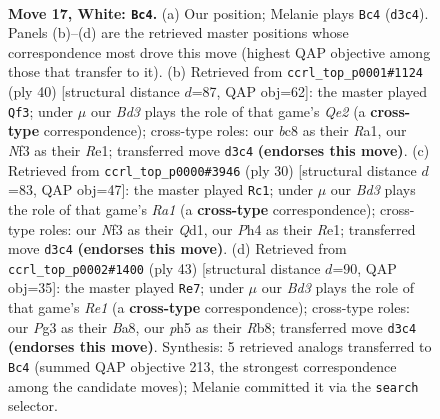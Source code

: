 \documentclass[11pt]{article}
\begin{document}
\clearpage

\begin{figure}[p]\centering
\begin{subfigure}{0.46\textwidth}\centering
\resizebox{\linewidth}{!}{%
\newchessgame
\chessboard[
  setfen={r1bqk2r/5p2/1p2pnp1/p1b4p/P4B1P/1P1B1NP1/2P1QP2/R3R1K1 w q - 1 17},
  showmover=false,
  pgfstyle=straightmove, color=movearrow, markmove={d3-c4}
]}
\caption{}
\end{subfigure}\hfill
\begin{subfigure}{0.46\textwidth}\centering
\resizebox{\linewidth}{!}{%
\newchessgame
\chessboard[
  setfen={4r1k1/1pq1npp1/p2r1b1p/P2p4/2pP1P2/2N1P1P1/1P2Q1BP/R3R2K w - - 3 21},
  showmover=false,
  pgfstyle=straightmove, color=movearrow, markmove={e2-f3}
]}
\caption{}
\end{subfigure}
\\[4pt]
\begin{subfigure}{0.46\textwidth}\centering
\resizebox{\linewidth}{!}{%
\newchessgame
\chessboard[
  setfen={r1b1r1k1/1pqn1pbp/p2p2p1/2pP4/P4B2/1P3NPP/4PPB1/R2QR1K1 w - - 1 16},
  showmover=false,
  pgfstyle=straightmove, color=movearrow, markmove={a1-c1}
]}
\caption{}
\end{subfigure}\hfill
\begin{subfigure}{0.46\textwidth}\centering
\resizebox{\linewidth}{!}{%
\newchessgame
\chessboard[
  setfen={br2r1k1/p4pp1/1p1bqn1p/1Bpp4/3P4/1P2P1P1/PBRNQPP1/2R3K1 b - - 8 22},
  showmover=false,
  pgfstyle=straightmove, color=movearrow, markmove={e8-e7}
]}
\caption{}
\end{subfigure}
\caption{\textbf{Move 17, White: \texttt{Bc4}.} (a) Our position; Melanie plays \texttt{Bc4} (\texttt{d3c4}). Panels (b)--(d) are the retrieved master positions whose correspondence most drove this move (highest QAP objective among those that transfer to it). (b) Retrieved from \texttt{ccrl\_top\_p0001\#1124} (ply 40) [structural distance $d$=87, QAP obj=62]: the master played \texttt{Qf3}; under $\mu$ our \emph{Bd3} plays the role of that game's \emph{Qe2} (a \textbf{cross-type} correspondence); cross-type roles: our \emph{b}c8 as their \emph{R}a1, our \emph{N}f3 as their \emph{R}e1; transferred move \texttt{d3c4} \textbf{(endorses this move)}. (c) Retrieved from \texttt{ccrl\_top\_p0000\#3946} (ply 30) [structural distance $d$=83, QAP obj=47]: the master played \texttt{Rc1}; under $\mu$ our \emph{Bd3} plays the role of that game's \emph{Ra1} (a \textbf{cross-type} correspondence); cross-type roles: our \emph{N}f3 as their \emph{Q}d1, our \emph{P}h4 as their \emph{R}e1; transferred move \texttt{d3c4} \textbf{(endorses this move)}. (d) Retrieved from \texttt{ccrl\_top\_p0002\#1400} (ply 43) [structural distance $d$=90, QAP obj=35]: the master played \texttt{Re7}; under $\mu$ our \emph{Bd3} plays the role of that game's \emph{Re1} (a \textbf{cross-type} correspondence); cross-type roles: our \emph{P}g3 as their \emph{B}a8, our \emph{p}h5 as their \emph{R}b8; transferred move \texttt{d3c4} \textbf{(endorses this move)}. Synthesis: 5 retrieved analogs transferred to \texttt{Bc4} (summed QAP objective 213, the strongest correspondence among the candidate moves); Melanie committed it via the \texttt{search} selector.}

\end{figure}
\end{document}
